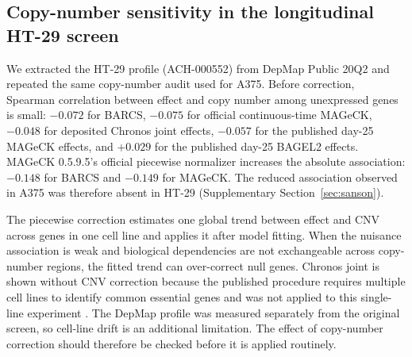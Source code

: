 \subsection{Copy-number sensitivity in the longitudinal HT-29 screen}

We extracted the HT-29 profile (ACH-000552) from DepMap Public 20Q2
\citep{depmap20q2} and repeated the same copy-number audit used for A375.
Before correction, Spearman correlation between effect and copy number among
unexpressed genes is small: $-0.072$ for BARCS, $-0.075$ for official
continuous-time MAGeCK, $-0.048$ for deposited Chronos joint effects, $-0.057$
for the published day-25 MAGeCK effects, and $+0.029$ for the published day-25
BAGEL2 effects.  MAGeCK 0.5.9.5's official piecewise normalizer increases the
absolute association: $-0.148$ for BARCS and $-0.149$ for MAGeCK.  The reduced
association observed in A375 was therefore absent in HT-29 (Supplementary
Section~\ref{sec:sanson}).

The piecewise correction estimates one global trend between effect and CNV
across genes in one cell line and applies it after model fitting.  When the
nuisance association is weak and biological dependencies are not exchangeable
across copy-number regions, the fitted trend can over-correct null genes.
Chronos joint is shown without CNV correction because the published procedure
requires multiple cell lines to identify common essential genes and was not
applied to this single-line experiment \citep{dempster2021chronos}.  The
DepMap profile was measured separately from the original screen, so cell-line
drift is an additional limitation.  The effect of copy-number correction
should therefore be checked before it is applied routinely.
